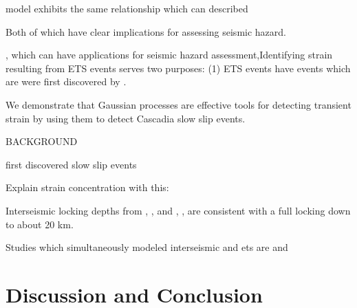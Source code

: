 \documentclass[10pt,a4paper]{article}
\begin{document}
model exhibits the same relationship  which can described  


Both of which have clear implications for assessing seismic hazard.

, which can have applications for seismic hazard assessment,Identifying strain resulting from ETS events serves two purposes: (1) ETS events have  events which are  were first discovered by \citet{Dragert2001}.   


We demonstrate that Gaussian processes are effective tools for detecting transient strain by using them to detect Cascadia slow slip events.  

BACKGROUND

\citet{Dragert2001} first discovered slow slip events

Explain strain concentration with this:

 
Interseismic locking depths from \citet{Fluck1997}, \citet{Murray2000}, \citet{McCaffrey2007} and \citet{McCaffrey2013}, \citet{Burgette2009}, \citet{schmalzle2014} are consistent with a full locking down to about 20 km.

Studies which simultaneously modeled interseismic and ets are \citet{Holtkamp2010} and \citet{schmalzle2014}


\section{Discussion and Conclusion}\label{sec:Discussion}







\end{document}
